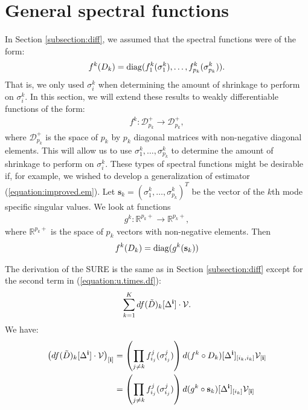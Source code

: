 \section{General spectral functions}
\label{sec:gen.spec.func}
In Section \ref{subsection:diff}, we assumed that the spectral functions were of
the form:
\begin{align*}
f^k(D_k) = \operatorname*{diag}(f_1^k(\sigma_1^k),\ldots,f_{p_k}^k(\sigma_{p_k}^k)).
\end{align*}
That is, we only used $\sigma_i^k$ when determining the amount of shrinkage to perform on $\sigma_i^k$. In this section, we will extend these results to weakly differentiable
functions of the form:
\begin{align*}
f^k: \mathcal{D}_{p_k}^+ \rightarrow \mathcal{D}_{p_k}^+,
\end{align*}
where $\mathcal{D}_{p_k}^+$ is the space of $p_k$ by $p_k$ diagonal
matrices with non-negative diagonal elements. This will allow us to use $\sigma_1^k,\ldots,\sigma_{p_k}^k$ to determine the amount of shrinkage to perform on $\sigma_i^k$. These types of spectral functions might be desirable if, for example, we wished to develop a generalization of estimator (\ref{equation:improved.em}). Let $\mathbf{s}_k =
(\sigma_1^k,\ldots,\sigma_{p_k}^k)^T$ be the vector of the $k$th mode
specific singular values. We look at functions
\begin{align*}
g^k: \mathbb{R}^{p_k+} \rightarrow \mathbb{R}^{p_k+},
\end{align*}
where $\mathbb{R}^{p_k+}$ is the space of $p_k$ vectors with
non-negative elements. Then
\begin{align*}
f^k(D_k) = \operatorname*{diag}(g^k(\mathbf{s}_k))
\end{align*}

The derivation of the SURE is the same as in Section \ref{subsection:diff} except for the second
term in (\ref{equation:u.times.df}):
\begin{align*}
\sum_{k=1}^K df(\tilde{D})_k[\Delta^{\bf i}] \cdot \mathcal{V}.
\end{align*}
 We have:
\begin{align}
\left(df(\tilde{D})_k[\Delta^{\bf i}] \cdot
  \mathcal{V}\right)_{[\mathbf{i}]} &= \left(\prod_{j\neq
    k}f_{i_j}^j(\sigma_{i_j}^j)\right)d(f^k \circ D_k)[\Delta^{\bf
  i}]_{[i_k,i_k]}\mathcal{V}_{[\mathbf{i}]}\nonumber\\
&= \left(\prod_{j\neq k}f_{i_j}^j(\sigma_{i_j}^j)\right)d(g^k \circ \mathbf{s}_k)[\Delta^{\bf i}]_{[i_k]}\mathcal{V}_{[\mathbf{i}]} \label{equation:g.circ.s}
\end{align}

